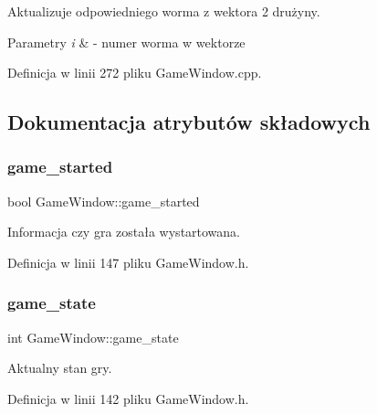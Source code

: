 Aktualizuje odpowiedniego worma z wektora 2 drużyny. 


\begin{DoxyParams}{Parametry}
{\em i} & -\/ numer worma w wektorze \\
\hline
\end{DoxyParams}


Definicja w linii 272 pliku Game\+Window.\+cpp.



\subsection{Dokumentacja atrybutów składowych}
\mbox{\label{class_game_window_a5ce0d59c491a490bc1d98afcac741016}} 
\subsubsection{\texorpdfstring{game\+\_\+started}{game\_started}}
{\footnotesize\ttfamily bool Game\+Window\+::game\+\_\+started}



Informacja czy gra została wystartowana. 



Definicja w linii 147 pliku Game\+Window.\+h.

\mbox{\label{class_game_window_aafe2b1768f704b81e4fe94115287b9f7}} 
\subsubsection{\texorpdfstring{game\+\_\+state}{game\_state}}
{\footnotesize\ttfamily int Game\+Window\+::game\+\_\+state}



Aktualny stan gry. 



Definicja w linii 142 pliku Game\+Window.\+h.

\mbox{\label{class_game_window_a5c677a419a09972501ce2c64b5166180}} 
